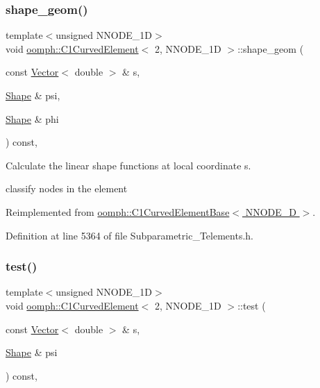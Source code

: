\subsubsection{\texorpdfstring{shape\+\_\+geom()}{shape\_geom()}}
{\footnotesize\ttfamily template$<$unsigned N\+N\+O\+D\+E\+\_\+1D$>$ \\
void \hyperlink{classoomph_1_1C1CurvedElement}{oomph\+::\+C1\+Curved\+Element}$<$ 2, N\+N\+O\+D\+E\+\_\+1D $>$\+::shape\+\_\+geom (\begin{DoxyParamCaption}\item[{const \hyperlink{classoomph_1_1Vector}{Vector}$<$ double $>$ \&}]{s,  }\item[{\hyperlink{classoomph_1_1Shape}{Shape} \&}]{psi,  }\item[{\hyperlink{classoomph_1_1Shape}{Shape} \&}]{phi }\end{DoxyParamCaption}) const\hspace{0.3cm}{\ttfamily [inline]}, {\ttfamily [virtual]}}



Calculate the linear shape functions at local coordinate s. 

classify nodes in the element 

Reimplemented from \hyperlink{classoomph_1_1C1CurvedElementBase_ae8b0385cfb2eeeb2e17916d76d1e439e}{oomph\+::\+C1\+Curved\+Element\+Base$<$ N\+N\+O\+D\+E\+\_\+D $>$}.



Definition at line 5364 of file Subparametric\+\_\+\+Telements.\+h.

\mbox{\label{classoomph_1_1C1CurvedElement_3_012_00_01NNODE__1D_01_4_ae6c5bb18e4448678ba6f8d52fe146181}} 
\subsubsection{\texorpdfstring{test()}{test()}}
{\footnotesize\ttfamily template$<$unsigned N\+N\+O\+D\+E\+\_\+1D$>$ \\
void \hyperlink{classoomph_1_1C1CurvedElement}{oomph\+::\+C1\+Curved\+Element}$<$ 2, N\+N\+O\+D\+E\+\_\+1D $>$\+::test (\begin{DoxyParamCaption}\item[{const \hyperlink{classoomph_1_1Vector}{Vector}$<$ double $>$ \&}]{s,  }\item[{\hyperlink{classoomph_1_1Shape}{Shape} \&}]{psi }\end{DoxyParamCaption}) const\hspace{0.3cm}{\ttfamily [inline]}, {\ttfamily [virtual]}}



